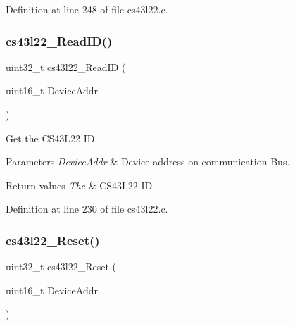 Definition at line 248 of file cs43l22.\+c.

\mbox{\label{group___c_s43_l22___private___functions_gad4e4e8b889500f0e64c546a31d4b6dca}} 
\subsubsection{\texorpdfstring{cs43l22\+\_\+\+Read\+I\+D()}{cs43l22\_ReadID()}}
{\footnotesize\ttfamily uint32\+\_\+t cs43l22\+\_\+\+Read\+ID (\begin{DoxyParamCaption}\item[{uint16\+\_\+t}]{Device\+Addr }\end{DoxyParamCaption})}



Get the C\+S43\+L22 ID. 


\begin{DoxyParams}{Parameters}
{\em Device\+Addr} & Device address on communication Bus. ~\newline
\\
\hline
\end{DoxyParams}

\begin{DoxyRetVals}{Return values}
{\em The} & C\+S43\+L22 ID \\
\hline
\end{DoxyRetVals}


Definition at line 230 of file cs43l22.\+c.

\mbox{\label{group___c_s43_l22___private___functions_ga647488feb466972a5557a2fe2e9350e7}} 
\subsubsection{\texorpdfstring{cs43l22\+\_\+\+Reset()}{cs43l22\_Reset()}}
{\footnotesize\ttfamily uint32\+\_\+t cs43l22\+\_\+\+Reset (\begin{DoxyParamCaption}\item[{uint16\+\_\+t}]{Device\+Addr }\end{DoxyParamCaption})}




